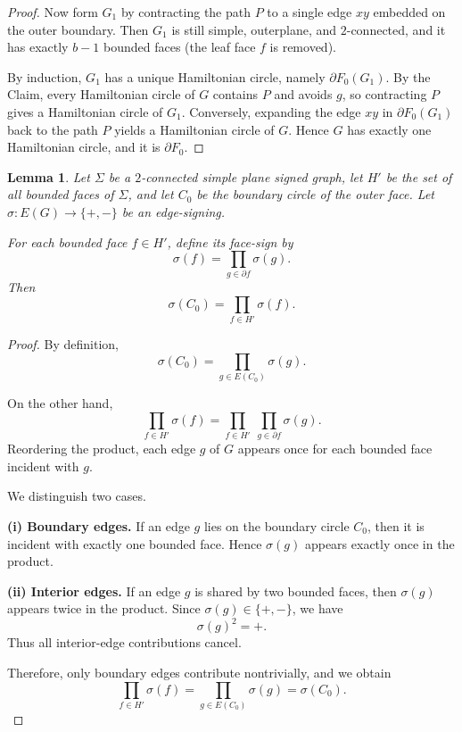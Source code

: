 \documentclass[12pt]{amsart}
\theoremstyle{theorem}%
\newtheorem{lemma}[theorem]{Lemma}
\theoremstyle{definition}%
\begin{document}
\begin{proof}
\medskip
Now form $G_1$ by contracting the path $P$ to a single edge $xy$ embedded on the outer boundary.
Then $G_1$ is still simple, outerplane, and $2$-connected, and it has exactly $b-1$ bounded faces
(the leaf face $f$ is removed).

By induction, $G_1$ has a unique Hamiltonian circle, namely $\partial F_0(G_1)$.
By the Claim, every Hamiltonian circle of $G$ contains $P$ and avoids $g$, so contracting $P$ gives a Hamiltonian circle of $G_1$.
Conversely, expanding the edge $xy$ in $\partial F_0(G_1)$ back to the path $P$ yields a Hamiltonian circle of $G$.
Hence $G$ has exactly one Hamiltonian circle, and it is $\partial F_0$.
\end{proof}








\begin{lemma}\label{facegraph}
Let $\Sigma$ be a $2$-connected simple plane signed graph, let $H'$ be the set of all bounded faces of $\Sigma$,
and let $C_0$ be the boundary circle of the outer face.
Let $\sigma:E(G)\to\{+,-\}$ be an edge-signing.

For each bounded face $f\in H'$, define its face-sign by
\[
\sigma(f)=\prod_{g\in \partial f}\sigma(g).
\]
Then
\[
\sigma(C_0)=\prod_{f\in H'} \sigma(f).
\]
\end{lemma}

\begin{proof}
By definition,
\[
\sigma(C_0)=\prod_{g\in E(C_0)} \sigma(g).
\]

On the other hand,
\[
\prod_{f\in H'} \sigma(f)
=\prod_{f\in H'} \ \prod_{g\in \partial f} \sigma(g).
\]
Reordering the product, each edge $g$ of $G$ appears once for each bounded face incident with $g$.

We distinguish two cases.

\smallskip
\noindent\textbf{(i) Boundary edges.}
If an edge $g$ lies on the boundary circle $C_0$, then it is incident with exactly one bounded face.
Hence $\sigma(g)$ appears exactly once in the product.

\smallskip
\noindent\textbf{(ii) Interior edges.}
If an edge $g$ is shared by two bounded faces, then $\sigma(g)$ appears twice in the product.
Since $\sigma(g)\in\{+,-\}$, we have
\[
\sigma(g)^2=+.
\]
Thus all interior-edge contributions cancel.

\smallskip
Therefore, only boundary edges contribute nontrivially, and we obtain
\[
\prod_{f\in H'} \sigma(f)
=\prod_{g\in E(C_0)} \sigma(g)
=\sigma(C_0).
\]
\end{proof}
\end{document}

